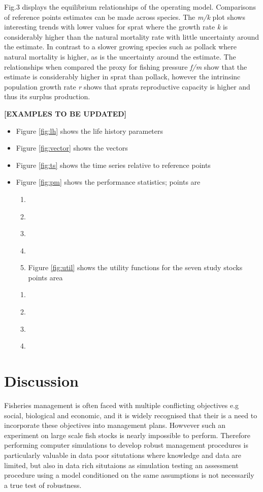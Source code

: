 \documentclass[preprint,12pt]{elsarticle}
\begin{document}
Fig.3 displays the equilibrium relationships of the operating model. Comparisons of reference points estimates can be made across species.  The \textit{m/k} plot shows interesting trends with lower values for sprat where the growth rate \textit{k} is considerably higher than the natural mortality rate with little uncertainty around the estimate. In contrast to a slower growing species such as pollack where natural mortality is higher, as is the uncertainty around the estimate. The relationships when compared the proxy for fishing pressure \textit{f/m} show that the estimate is considerably higher in sprat than pollack, however the intrinsinc population growth rate \textit{r} shows that sprats reproductive capacity is higher and thus its surplus production. 


\textbf{[EXAMPLES TO BE UPDATED]}
\begin{itemize}
\item Figure \ref{fig:lh} shows the life history parameters
\item Figure \ref{fig:vector} shows the vectors
\item Figure \ref{fig:ts} shows the time series relative to reference points
\item Figure \ref{fig:pm} shows the performance statistics; points are
\begin{enumerate}
 \item ~
 \item ~
 \item ~
 \item ~\item Figure \ref{fig:util} shows the utility functions for the seven study stocks points area
\end{enumerate}
\begin{enumerate}
 \item ~
 \item ~
 \item ~
 \item ~
\end{enumerate}

\end{itemize}

\section{Discussion}

Fisheries management is often faced with multiple conflicting objectives e.g social, biological and economic, and it is widely recognised that their is a need to incorporate these objectives into management plans. Howvever such an experiment on large scale fish stocks is nearly impossible to perform.  Therefore performing computer simulations to develop robust management procedures is particularly valuable in data poor situtations where knowledge and data are limited, but also in data rich situtaions as simulation testing an assessment procedure using a model conditioned on the same assumptions is not necessarily a true test of robustness.  
\end{document}

